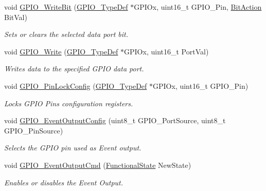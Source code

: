 \begin{DoxyCompactItemize}
void \hyperlink{group___g_p_i_o___exported___functions_ga8f7b237fd744d9f7456fbe0da47a9b80}{G\+P\+I\+O\+\_\+\+Write\+Bit} (\hyperlink{struct_g_p_i_o___type_def}{G\+P\+I\+O\+\_\+\+Type\+Def} $\ast$G\+P\+I\+Ox, uint16\+\_\+t G\+P\+I\+O\+\_\+\+Pin, \hyperlink{group___g_p_i_o___exported___types_ga176130b21c0e719121470a6042d4cf19}{Bit\+Action} Bit\+Val)
\begin{DoxyCompactList}\small\item\em Sets or clears the selected data port bit. \end{DoxyCompactList}\item 
void \hyperlink{group___g_p_i_o___exported___functions_gaa925f19c8547a00c7a0c269a84873bf9}{G\+P\+I\+O\+\_\+\+Write} (\hyperlink{struct_g_p_i_o___type_def}{G\+P\+I\+O\+\_\+\+Type\+Def} $\ast$G\+P\+I\+Ox, uint16\+\_\+t Port\+Val)
\begin{DoxyCompactList}\small\item\em Writes data to the specified G\+P\+IO data port. \end{DoxyCompactList}\item 
void \hyperlink{group___g_p_i_o___exported___functions_gad2f2e615928c69fd0d8c641a7cedaafc}{G\+P\+I\+O\+\_\+\+Pin\+Lock\+Config} (\hyperlink{struct_g_p_i_o___type_def}{G\+P\+I\+O\+\_\+\+Type\+Def} $\ast$G\+P\+I\+Ox, uint16\+\_\+t G\+P\+I\+O\+\_\+\+Pin)
\begin{DoxyCompactList}\small\item\em Locks G\+P\+IO Pins configuration registers. \end{DoxyCompactList}\item 
void \hyperlink{group___g_p_i_o___exported___functions_ga935f31ed7a86c6cb594cf34313b4b7af}{G\+P\+I\+O\+\_\+\+Event\+Output\+Config} (uint8\+\_\+t G\+P\+I\+O\+\_\+\+Port\+Source, uint8\+\_\+t G\+P\+I\+O\+\_\+\+Pin\+Source)
\begin{DoxyCompactList}\small\item\em Selects the G\+P\+IO pin used as Event output. \end{DoxyCompactList}\item 
void \hyperlink{group___g_p_i_o___exported___functions_gaf13ab3d59e467df44b492f1cdfe2f588}{G\+P\+I\+O\+\_\+\+Event\+Output\+Cmd} (\hyperlink{group___exported__types_gac9a7e9a35d2513ec15c3b537aaa4fba1}{Functional\+State} New\+State)
\begin{DoxyCompactList}\small\item\em Enables or disables the Event Output. \end{DoxyCompactList}\item 

\end{DoxyCompactItemize}
